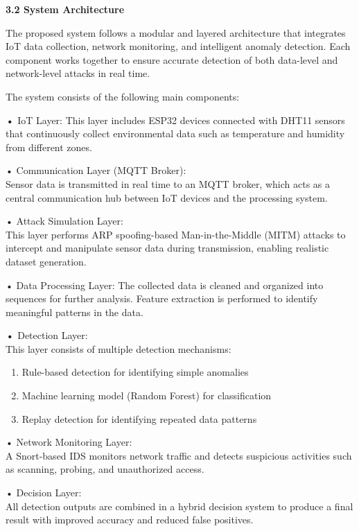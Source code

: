 \textbf{3.2 System Architecture}

The proposed system follows a modular and layered architecture that
integrates IoT data collection, network monitoring, and intelligent
anomaly detection. Each component works together to ensure accurate
detection of both data-level and network-level attacks in real time.

The system consists of the following main components:

\textbf{•} IoT Layer:\textbf{\hfill\break
}This layer includes ESP32 devices connected with DHT11 sensors that
continuously collect environmental data such as temperature and humidity
from different zones.

• Communication Layer (MQTT Broker):\\
Sensor data is transmitted in real time to an MQTT broker, which acts as
a central communication hub between IoT devices and the processing
system.

• Attack Simulation Layer:\\
This layer performs ARP spoofing-based Man-in-the-Middle (MITM) attacks
to intercept and manipulate sensor data during transmission, enabling
realistic dataset generation.

• Data Processing Layer:\textbf{\hfill\break
}The collected data is cleaned and organized into sequences for further
analysis. Feature extraction is performed to identify meaningful
patterns in the data.

\textbf{•} Detection Layer:\\
This layer consists of multiple detection mechanisms:

\begin{enumerate}
\def\labelenumi{\arabic{enumi}.}
\item
  Rule-based detection for identifying simple anomalies
\item
  Machine learning model (Random Forest) for classification
\item
  Replay detection for identifying repeated data patterns
\end{enumerate}

• Network Monitoring Layer:\\
A Snort-based IDS monitors network traffic and detects suspicious
activities such as scanning, probing, and unauthorized access.

• Decision Layer:\\
All detection outputs are combined in a hybrid decision system to
produce a final result with improved accuracy and reduced false
positives.


